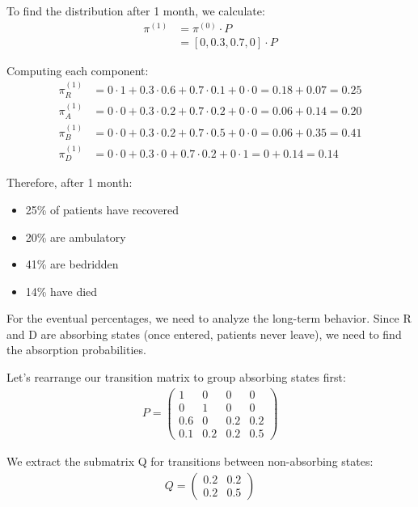 \documentclass{article}
\begin{document}
To find the distribution after 1 month, we calculate:
\begin{align*}
\pi^{(1)} &= \pi^{(0)} \cdot P \\
&= [0, 0.3, 0.7, 0] \cdot P
\end{align*}

Computing each component:
\begin{align*}
\pi^{(1)}_R &= 0 \cdot 1 + 0.3 \cdot 0.6 + 0.7 \cdot 0.1 + 0 \cdot 0 = 0.18 + 0.07 = 0.25 \\
\pi^{(1)}_A &= 0 \cdot 0 + 0.3 \cdot 0.2 + 0.7 \cdot 0.2 + 0 \cdot 0 = 0.06 + 0.14 = 0.20 \\
\pi^{(1)}_B &= 0 \cdot 0 + 0.3 \cdot 0.2 + 0.7 \cdot 0.5 + 0 \cdot 0 = 0.06 + 0.35 = 0.41 \\
\pi^{(1)}_D &= 0 \cdot 0 + 0.3 \cdot 0 + 0.7 \cdot 0.2 + 0 \cdot 1 = 0 + 0.14 = 0.14
\end{align*}

Therefore, after 1 month:
\begin{itemize}
    \item 25\% of patients have recovered
    \item 20\% are ambulatory
    \item 41\% are bedridden
    \item 14\% have died
\end{itemize}

For the eventual percentages, we need to analyze the long-term behavior. Since R and D are absorbing states (once entered, patients never leave), we need to find the absorption probabilities.

Let's rearrange our transition matrix to group absorbing states first:
\begin{align*}
P = \begin{pmatrix}
1 & 0 & 0 & 0 \\
0 & 1 & 0 & 0 \\
0.6 & 0 & 0.2 & 0.2 \\
0.1 & 0.2 & 0.2 & 0.5
\end{pmatrix}
\end{align*}

We extract the submatrix Q for transitions between non-absorbing states:
\begin{align*}
Q = \begin{pmatrix}
0.2 & 0.2 \\
0.2 & 0.5
\end{pmatrix}
\end{align*}
\end{document}
